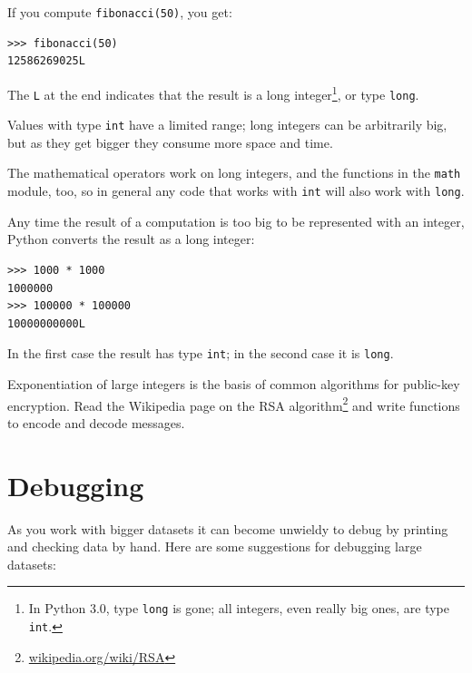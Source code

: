 \documentclass[10pt]{book}
\begin{document}

If you compute {\tt fibonacci(50)}, you get:

\beforeverb
\begin{verbatim}
>>> fibonacci(50)
12586269025L
\end{verbatim}
\afterverb
%
The {\tt L} at the end indicates that the result is a long
integer\footnote{In Python 3.0, type {\tt long} is gone; all integers,
  even really big ones, are type {\tt int}.}, or type {\tt long}.


Values with type {\tt int} have a limited range;
long integers can be arbitrarily big, but as they get bigger
they consume more space and time.

The mathematical operators work on long integers, and the functions
in the {\tt math} module, too, so in general any code that
works with {\tt int} will also work with {\tt long}.

Any time the result of a computation is too big to be represented with
an integer, Python converts the result as a long integer:

\beforeverb
\begin{verbatim}
>>> 1000 * 1000
1000000
>>> 100000 * 100000
10000000000L
\end{verbatim}
\afterverb
%
In the first case the result has type {\tt int}; in the
second case it is {\tt long}.

\begin{ex}


Exponentiation of large integers is the basis of common
algorithms for public-key encryption.  Read the Wikipedia
page on the RSA algorithm\footnote{\url{wikipedia.org/wiki/RSA}}
and write functions to encode and decode messages.

\end{ex}


\section{Debugging}

As you work with bigger datasets it can become unwieldy to
debug by printing and checking data by hand.  Here are some
suggestions for debugging large datasets:
\end{document}
